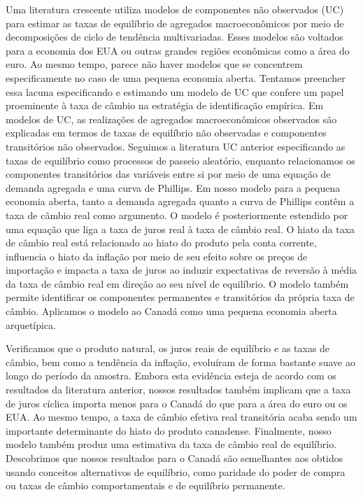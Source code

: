 Uma literatura crescente utiliza modelos de componentes não observados (UC) para estimar as taxas de equilíbrio de agregados macroeconômicos por meio de decomposições de ciclo de tendência multivariadas. Esses modelos são voltados para a economia dos EUA ou outras grandes regiões econômicas como a área do euro. Ao mesmo tempo, parece não haver modelos que se concentrem especificamente no caso de uma pequena economia aberta. Tentamos preencher essa lacuna especificando e estimando um modelo de UC que confere um papel proeminente à taxa de câmbio na estratégia de identificação empírica. Em modelos de UC, as realizações de agregados macroeconômicos observados são explicadas em termos de taxas de equilíbrio não observadas e componentes transitórios não observados. Seguimos a literatura UC anterior especificando as taxas de equilíbrio como processos de passeio aleatório, enquanto relacionamos os componentes transitórios das variáveis entre si por meio de uma equação de demanda agregada e uma curva de Phillips. Em nosso modelo para a pequena economia aberta, tanto a demanda agregada quanto a curva de Phillips contêm a taxa de câmbio real como argumento. O modelo é posteriormente estendido por uma equação que liga a taxa de juros real à taxa de câmbio real. O hiato da taxa de câmbio real está relacionado ao hiato do produto pela conta corrente, influencia o hiato da inflação por meio de seu efeito sobre os preços de importação e impacta a taxa de juros ao induzir expectativas de reversão à média da taxa de câmbio real em direção ao seu nível de equilíbrio. O modelo também permite identificar os componentes permanentes e transitórios da própria taxa de câmbio. Aplicamos o modelo ao Canadá como uma pequena economia aberta arquetípica.

Verificamos que o produto natural, os juros reais de equilíbrio e as taxas de câmbio, bem como a tendência da inflação, evoluíram de forma bastante suave ao longo do período da amostra. Embora esta evidência esteja de acordo com os resultados da literatura anterior, nossos resultados também implicam que a taxa de juros cíclica importa menos para o Canadá do que para a área do euro ou os EUA. Ao mesmo tempo, a taxa de câmbio efetiva real transitória acaba sendo um importante determinante do hiato do produto canadense. Finalmente, nosso modelo também produz uma estimativa da taxa de câmbio real de equilíbrio. Descobrimos que nossos resultados para o Canadá são semelhantes aos obtidos usando conceitos alternativos de equilíbrio, como paridade do poder de compra ou taxas de câmbio comportamentais e de equilíbrio permanente.

